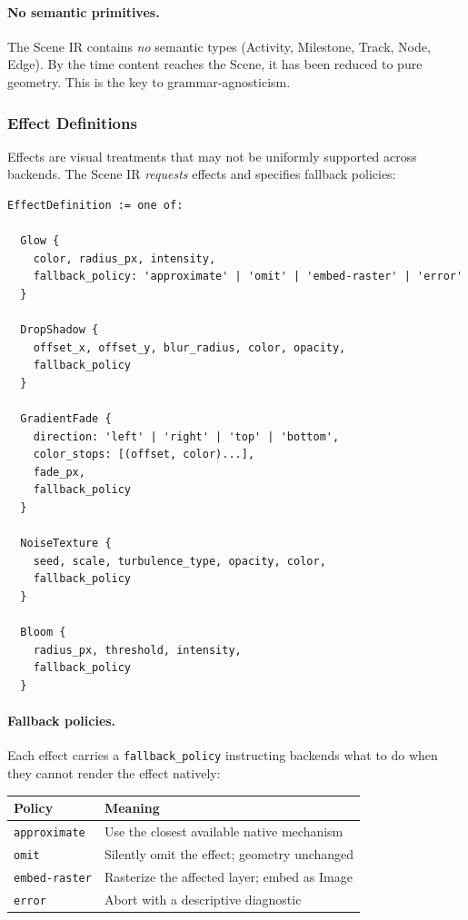 \paragraph{No semantic primitives.}
The Scene IR contains \emph{no} semantic types (Activity, Milestone, Track, Node, Edge). By the time content reaches the Scene, it has been reduced to pure geometry. This is the key to grammar-agnosticism.

\subsubsection{Effect Definitions}

Effects are visual treatments that may not be uniformly supported across backends. The Scene IR \emph{requests} effects and specifies fallback policies:

\begin{Verbatim}[frame=single,fontsize=\small]
EffectDefinition := one of:

  Glow {
    color, radius_px, intensity,
    fallback_policy: 'approximate' | 'omit' | 'embed-raster' | 'error'
  }

  DropShadow {
    offset_x, offset_y, blur_radius, color, opacity,
    fallback_policy
  }

  GradientFade {
    direction: 'left' | 'right' | 'top' | 'bottom',
    color_stops: [(offset, color)...],
    fade_px,
    fallback_policy
  }

  NoiseTexture {
    seed, scale, turbulence_type, opacity, color,
    fallback_policy
  }

  Bloom {
    radius_px, threshold, intensity,
    fallback_policy
  }
\end{Verbatim}

\paragraph{Fallback policies.}
Each effect carries a \texttt{fallback\_policy} instructing backends what to do when they cannot render the effect natively:

\begin{center}
\small
\begin{tabular}{ll}
\toprule
\textbf{Policy} & \textbf{Meaning} \\
\midrule
\texttt{approximate} & Use the closest available native mechanism \\
\texttt{omit}        & Silently omit the effect; geometry unchanged \\
\texttt{embed-raster}& Rasterize the affected layer; embed as Image \\
\texttt{error}       & Abort with a descriptive diagnostic \\
\bottomrule
\end{tabular}
\end{center}


